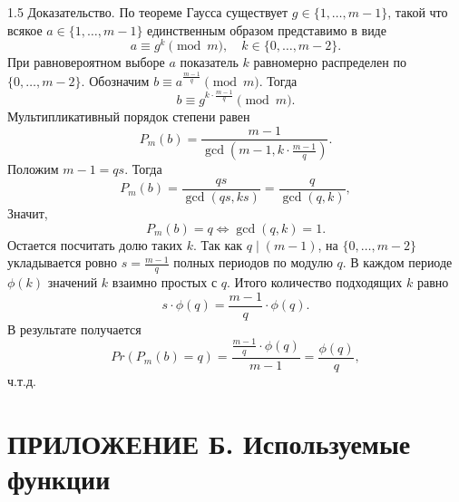 \documentclass[14pt,a4paper]{extarticle}
\begin{document}
\begin{spacing}{1.5}
\noindent Доказательство.
По теореме Гаусса существует \(g \in \{1, \dots, m-1\}\), такой что всякое \(a \in \{1, \dots, m-1\}\) единственным образом представимо в виде
\[
    a \equiv g^k \pmod m, \quad k \in \{0, \dots, m-2\}.
\]
При равновероятном выборе \(a\) показатель \(k\) равномерно распределен по \(\{0, \dots, m-2\}\).
Обозначим \(b \equiv a^{\frac{m-1}{q}} \pmod m\). Тогда
\[
    b \equiv g^{k \cdot \frac{m-1}{q}} \pmod m.
\]
Мультипликативный порядок степени равен
\[
    P_m(b) = \frac{m-1}{\gcd(m-1, k \cdot \frac{m-1}{q})}.
\]
Положим \(m-1 = qs\). Тогда
\[
    P_m(b) = \frac{qs}{\gcd(qs, ks)} = \frac{q}{\gcd(q, k)},
\]
Значит,
\[
    P_m(b) = q \Leftrightarrow \gcd(q, k) = 1.
\]
Остается посчитать долю таких \(k\).
Так как \(q \mid (m-1)\), на \(\{0, \dots, m-2\}\) укладывается ровно \(s = \frac{m-1}{q}\) полных периодов по модулю \(q\). В каждом периоде \(\phi(k)\) значений \(k\) взаимно простых с \(q\). Итого количество подходящих \(k\) равно
\[
    s \cdot \phi(q) = \frac{m-1}{q} \cdot \phi(q).
\]
В результате получается
\[
    Pr(P_m(b) = q) = \frac{\frac{m-1}{q} \cdot \phi(q)}{m-1} = \frac{\phi(q)}{q},
\]
ч.т.д.

\end{spacing}

\newpage
\section*{ПРИЛОЖЕНИЕ Б. Используемые функции}
\end{document}
